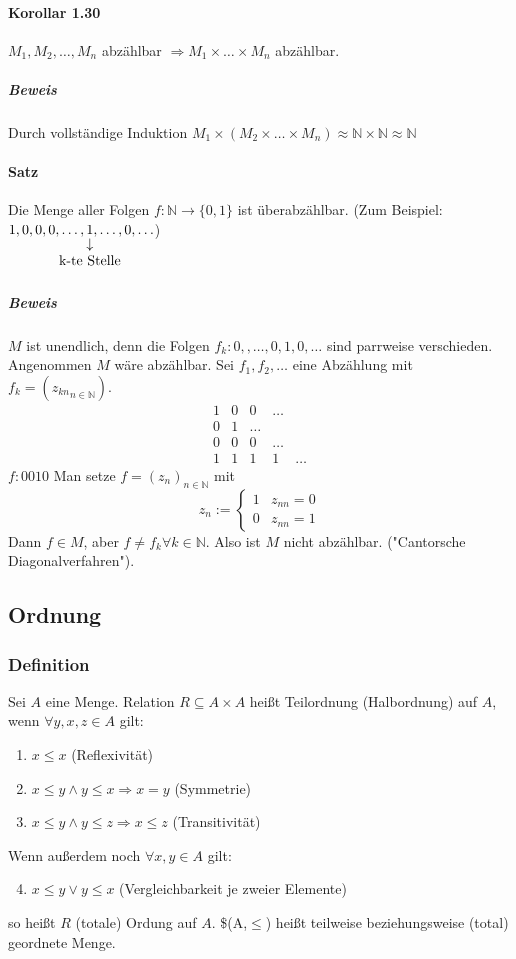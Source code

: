 \documentclass[a4paper]{scrartcl}
\DeclareMathOperator{\Forall}{\forall}%
\begin{document}
\paragraph{Korollar 1.30}
\label{sec-2-5-1-4}
$M_1,M_2,\ldots,M_n$ abzählbar $\Rightarrow M_1 \times \ldots \times M_n$ abzählbar.
\subparagraph{Beweis}
\label{sec-2-5-1-4-1}
Durch vollständige Induktion $M_1\times(M_2\times\ldots \times M_n)\approx \mathbb{N}\times\mathbb{N}\approx\mathbb{N}$
\paragraph{Satz}
\label{sec-2-5-1-5}
Die Menge aller Folgen $f:\mathbb{N}\to\{0,1\}$ ist überabzählbar. (Zum Beispiel: $1,0,0,0,\ldots, \underarrow[1]{\text{k-te Stelle}},\ldots,0,\ldots$)
\subparagraph{Beweis}
\label{sec-2-5-1-5-1}
$M$ ist unendlich, denn die Folgen $f_k:0,,\ldots,0,1,0,\ldots$ sind parrweise verschieden. Angenommen $M$ wäre abzählbar. Sei $f_1,f_2, \ldots$ eine Abzählung mit $f_k = ({z_{kn}}_{n\in \mathbb{N}})$.
\[\begin{matrix}1 & 0 & 0 & \ldots \\ 0 & 1 & \ldots \\ 0 & 0 & 0 & \ldots \\ 1 & 1 & 1 & 1 & \ldots \end{matrix}\]
$f:0 0 1 0$ Man setze $f=(z_n)_{n\in\mathbb{N}}$ mit \[z_n := \begin{cases} 1 & z_{nn} = 0 \\ 0 & z_{nn} = 1\end{cases}\]
Dann $f\in M$, aber $f\neq f_k \Forall k\in\mathbb{N}$. Also ist $M$ nicht abzählbar. ("Cantorsche Diagonalverfahren").
\subsection{Ordnung}
\label{sec-2-6}
\subsubsection{Definition}
\label{sec-2-6-1}
Sei $A$ eine Menge. Relation $R\subseteq A\times A$ heißt Teilordnung (Halbordnung) auf $A$, wenn $\Forall y,x,z\in A$ gilt:
\begin{enumerate}
\item $x\leq x$ \hfill (Reflexivität)
\item $x\leq y \wedge y\leq x \Rightarrow x = y$ \hfill (Symmetrie)
\item $x\leq y \wedge y\leq z \Rightarrow x\leq z$ \hfill (Transitivität)
\end{enumerate}
Wenn außerdem noch $\Forall x,y\in A$ gilt:
\begin{enumerate}
\setcounter{enumi}{3}
\item $x\leq y \vee y\leq x$ \hfill (Vergleichbarkeit je zweier Elemente)
\end{enumerate}
so heißt $R$ (totale) Ordung auf $A$. \$(A,$\le$) heißt teilweise beziehungsweise (total) geordnete Menge.
\end{document}
